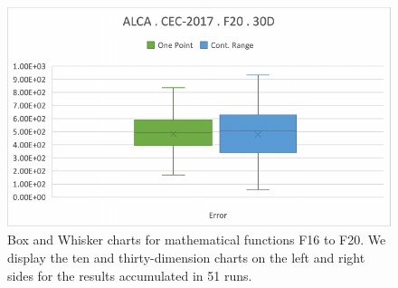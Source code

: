 \documentclass[graybox]{svmult}
\begin{document}
\begin{figure}[!ht]
\begin{minipage}[h]{0.49\linewidth}
        \end{minipage}
        \hfill
        \begin{minipage}[h]{0.49\linewidth}
            \includegraphics[width=1\linewidth]{img/fig_experiment_F20x30D.pdf} 
        \end{minipage}
        
        \caption{Box and Whisker charts for mathematical functions F16 to F20. We display the ten and thirty-dimension charts on the left and right sides for the results accumulated in 51 runs.} \label{fig.experiment_F16-F20}
    \end{figure}

    \FloatBarrier
\end{document}
